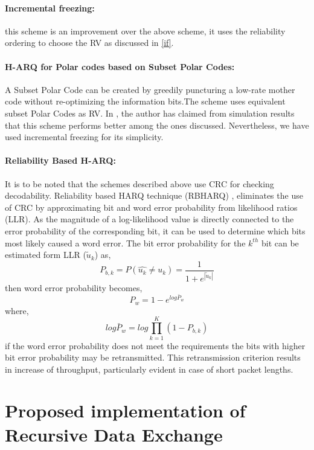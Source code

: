 \documentclass[
11pt, %
a4paper, %
oneside, %
headinclude,footinclude, %
BCOR5mm, %
]{scrartcl}
\begin{document}
\paragraph{Incremental freezing:} this scheme is an improvement over the above scheme, it uses the reliability ordering to choose the RV as discussed in \ref{if}.
\paragraph{H-ARQ for Polar codes based on Subset Polar Codes:}
A Subset Polar Code can be created by greedily puncturing a low-rate mother code without re-optimizing the information bits.The scheme uses equivalent subset Polar Codes as RV. In \cite{harqtav}, the author has claimed from simulation results that this scheme performs better among the ones discussed. Nevertheless, we have used incremental freezing for its simplicity.  
\paragraph{Reliability Based H-ARQ:}
It is to be noted that the schemes described above use CRC for checking decodability. Reliability based HARQ technique (RBHARQ) \cite{rbharq}, eliminates the use of CRC by approximating bit and word error probability from likelihood ratios (LLR).  As the magnitude of a log-likelihood value is directly
connected to the error probability of the corresponding
bit, it can be used to determine which bits most
likely caused a word error. The bit error probability for the $k^{th}$ bit can be estimated form LLR ($\tilde{u}_k$) as,
$$ P_{b,k}=P(\hat{u_k} \neq u_k) = \frac{1}{1+e^{|\tilde{u}_k|}}$$
then word error probability becomes, $$P_w=1-e^{log\bar{P}_w}$$
where, $$log\bar{P}_w=log\prod_{k=1}^K (1- P_{b,k})$$ 
if the word error probability does not meet the requirements the bits with higher bit error probability may be retransmitted. This retransmission criterion results in increase of throughput, particularly evident in case of short packet lengths.



\newpage
\section{Proposed implementation of Recursive Data Exchange} \label{propsol}
\end{document}
